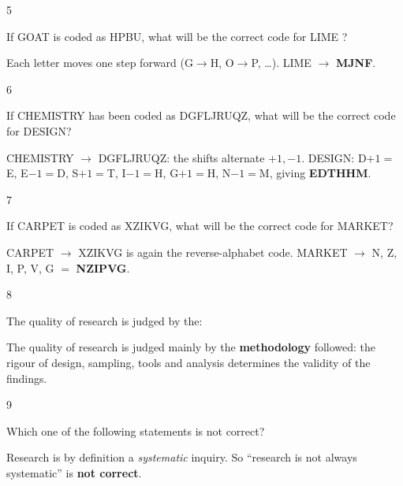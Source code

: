 \begin{question}{5}
{If GOAT is coded as HPBU, what will be the correct code for LIME ?\par}
\begin{explain}
Each letter moves one step forward (G$\rightarrow$H, O$\rightarrow$P, \ldots). LIME $\rightarrow$ \textbf{MJNF}.
\end{explain}
\end{question}

\begin{question}{6}
{If CHEMISTRY has been coded as DGFLJRUQZ, what will be the correct code for DESIGN?\par}
\begin{explain}
CHEMISTRY $\rightarrow$ DGFLJRUQZ: the shifts alternate $+1, -1$.
DESIGN: D$+1=$E, E$-1=$D, S$+1=$T, I$-1=$H, G$+1=$H, N$-1=$M, giving \textbf{EDTHHM}.
\end{explain}
\end{question}

\begin{question}{7}
{If CARPET is coded as XZIKVG, what will be the correct code for MARKET?\par}
\begin{explain}
CARPET $\rightarrow$ XZIKVG is again the reverse-alphabet code. MARKET $\rightarrow$ N, Z, I, P, V, G $=$ \textbf{NZIPVG}.
\end{explain}
\end{question}

\begin{question}{8}
{The quality of research is judged by the:\par}
\begin{explain}
The quality of research is judged mainly by the \textbf{methodology} followed: the rigour of design, sampling, tools and analysis determines the validity of the findings.
\end{explain}
\end{question}

\begin{question}{9}
{Which one of the following statements is not correct?\par}
\begin{explain}
Research is by definition a \emph{systematic} inquiry. So ``research is not always systematic'' is \textbf{not correct}.
\end{explain}
\end{question}

